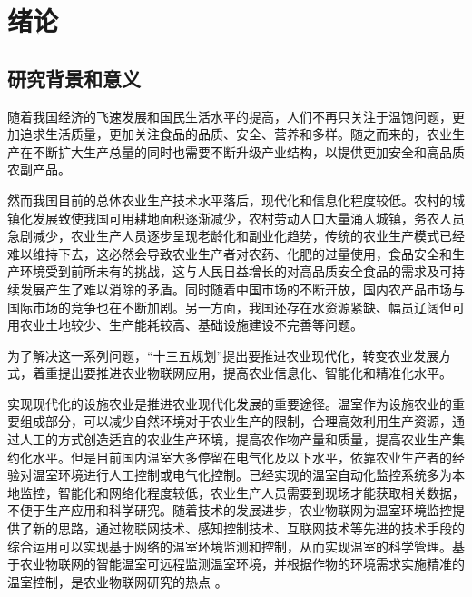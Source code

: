 

\chapter{绪论}
\label{chapter:Introduction}

\section{研究背景和意义}
随着我国经济的飞速发展和国民生活水平的提高，人们不再只关注于温饱问题，更加追求生活质量，更加关注食品的品质、安全、营养和多样\supercite{FengZhiming2007,ZhaoQiguo2011}。随之而来的，农业生产在不断扩大生产总量的同时也需要不断升级产业结构，以提供更加安全和高品质农副产品。

然而我国目前的总体农业生产技术水平落后，现代化和信息化程度较低。农村的城镇化发展致使我国可用耕地面积逐渐减少，农村劳动人口大量涌入城镇\supercite{YuJunli2001}，务农人员急剧减少，农业生产人员逐步呈现老龄化和副业化趋势\supercite{LuoChaobin2005}，传统的农业生产模式已经难以维持下去，这必然会导致农业生产者对农药、化肥的过量使用，食品安全和生产环境受到前所未有的挑战，这与人民日益增长的对高品质安全食品的需求及可持续发展产生了难以消除的矛盾。同时随着中国市场的不断开放，国内农产品市场与国际市场的竞争也在不断加剧。另一方面，我国还存在水资源紧缺、幅员辽阔但可用农业土地较少、生产能耗较高、基础设施建设不完善等问题。

为了解决这一系列问题，“十三五规划”提出要推进农业现代化，转变农业发展方式，着重提出要推进农业物联网应用，提高农业信息化、智能化和精准化水平。

实现现代化的设施农业是推进农业现代化发展的重要途径\supercite{LiuLei2013}。温室作为设施农业的重要组成部分，可以减少自然环境对于农业生产的限制，合理高效利用生产资源，通过人工的方式创造适宜的农业生产环境，提高农作物产量和质量，提高农业生产集约化水平。但是目前国内温室大多停留在电气化及以下水平，依靠农业生产者的经验对温室环境进行人工控制或电气化控制。已经实现的温室自动化监控系统多为本地监控，智能化和网络化程度较低，农业生产人员需要到现场才能获取相关数据，不便于生产应用和科学研究\supercite{ZhouDele2013}。随着技术的发展进步，农业物联网为温室环境监控提供了新的思路，通过物联网技术、感知控制技术、互联网技术等先进的技术手段的综合运用可以实现基于网络的温室环境监测和控制，从而实现温室的科学管理\supercite{ZhouChunsong2014,ZhongHuahui2011,HeFen2007}。基于农业物联网的智能温室可远程监测温室环境，并根据作物的环境需求实施精准的温室控制，是农业物联网研究的热点\supercite{ZhaoJing2010,QiaoXiaojun2005} 。

